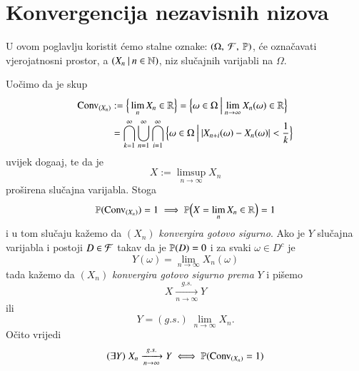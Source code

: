
\chapter{Konvergencija nezavisnih nizova}

U ovom poglavlju koristit \' cemo stalne oznake: $(\Omega, \: \mathcal{F}, \: \mathbb{P})$, \' ce ozna\v cavati vjerojatnosni prostor, a $({X_n} \: | \: {n \in \mathbb{N}})$, niz slu\v cajnih varijabli na $\Omega$.

Uo\v cimo da je skup
\begin{equation*}
    \begin{aligned}
        \mathrm{Conv}_{(X_n)} &:= \Big\{ \lim\limits_{n} X_n \in \mathbb{R} \Big\} = \Big\{ {\omega \in \Omega} \: \Big| \: {\lim\limits_{n \to \infty} X_n (\omega) \in \mathbb{R}} \Big\}\\
        &= \bigcap\limits_{k = 1}^{\infty} \bigcup\limits_{n = 1}^{\infty} \bigcap\limits_{i = 1}^{\infty} \Big\{ {\omega \in \Omega} \: \Big| \: {|X_{n + i} (\omega) - X_n (\omega)| < \frac{1}{k}} \Big\}
    \end{aligned}
\end{equation*}
uvijek doga\dj aj, te da je
\begin{equation*}
    X:= \limsup\limits_{n \to \infty} X_n
\end{equation*}
pro\v sirena slu\v cajna varijabla.
Stoga
\begin{equation}    \label{jed:11.1}
    \mathbb{P}({\mathrm{Conv}_{(X_n)}}) = 1 \implies \mathbb{P} \Big( X = \lim\limits_n X_n \in \mathbb{R} \Big) = 1
\end{equation}
i u tom slu\v caju ka\v zemo da $(X_n)$ \emph{konvergira gotovo sigurno}.
Ako je $Y$ slu\v cajna varijabla i postoji $D \in \mathcal{F}$ takav da je $\mathbb{P}({D}) = 0$ i za svaki $\omega \in D^c$ je
\begin{equation*}
    Y(\omega) = \lim\limits_{n \to \infty} X_n (\omega)
\end{equation*}
tada ka\v zemo da $(X_n)$ \emph{konvergira gotovo sigurno prema} $Y$ i pi\v semo
\begin{equation*}
    X \xrightarrow[n \to \infty]{g.s.} Y
\end{equation*}
ili
\begin{equation*}
    Y = (g.s.) \; \lim\limits_{n \to \infty} X_n.
\end{equation*}
O\v cito vrijedi
\begin{equation}    \label{jed:11.2}
    (\exists Y) \; X_n \xrightarrow[n \to \infty]{g.s.} Y \iff \mathbb{P}({\mathrm{Conv}_{(X_n)} = 1})
\end{equation}
